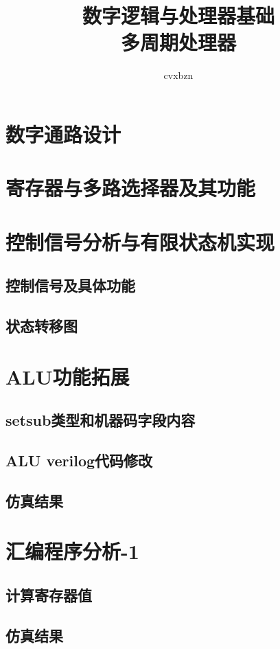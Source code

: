 \documentclass{article}
\title{数字逻辑与处理器基础\\多周期处理器}
\author{cvxbzn}
\begin{document}
\maketitle

\section{数字通路设计}
\section{寄存器与多路选择器及其功能}

\section{控制信号分析与有限状态机实现}
\subsection{控制信号及具体功能}
\subsection{状态转移图}

\section{ALU功能拓展}
\subsection{setsub类型和机器码字段内容}
\subsection{ALU verilog代码修改}
\subsection{仿真结果}

\section{汇编程序分析-1}
\subsection{计算寄存器值}
\subsection{仿真结果}
\end{document}

